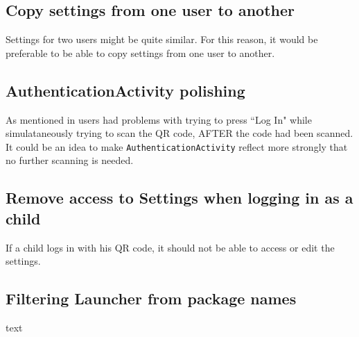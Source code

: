 \subsection{Copy settings from one user to another}
Settings for two users might be quite similar.
For this reason, it would be preferable to be able to copy settings from one user to another.                                                                                   
                                                                                   
\subsection{AuthenticationActivity polishing}

As mentioned in  users had problems with trying to press ``Log In" while simulataneously trying to scan the QR code, AFTER the code had been scanned.
It could be an idea to make \lstinline!AuthenticationActivity! reflect more strongly that no further scanning is needed.

\subsection{Remove access to Settings when logging in as a child}

If a child logs in with his QR code, it should not be able to access or edit the settings.

\subsection{Filtering Launcher from package names}
text